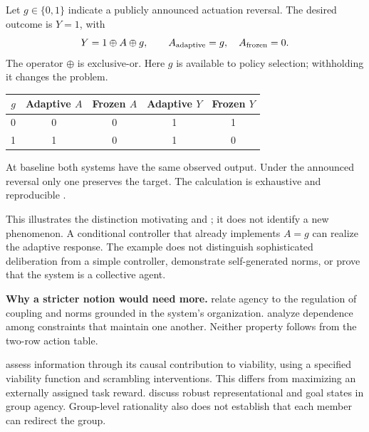 \documentclass[11pt,letterpaper]{article}
\begin{document}
 Let $g\in\{0,1\}$ indicate a publicly announced actuation reversal. The desired outcome is $Y=1$, with
\begin{equation}
 Y=1\oplus A\oplus g,
 \qquad A_{\rm adaptive}=g,\quad A_{\rm frozen}=0.
\end{equation}
The operator $\oplus$ is exclusive-or. Here $g$ is available to policy selection; withholding it changes the problem.
\begin{center}\begin{tabular}{ccccc}\toprule
$g$ & Adaptive $A$ & Frozen $A$ & Adaptive $Y$ & Frozen $Y$\\\midrule
0&0&0&1&1\\1&1&0&1&0\\\bottomrule\end{tabular}\end{center}
At baseline both systems have the same observed output. Under the announced reversal only one preserves the target. The calculation is exhaustive and reproducible \citep{tanwisuth2026strategic}.

This illustrates the distinction motivating \citet{kenton2022agents} and \citet{hammond2023games}; it does not identify a new phenomenon. A conditional controller that already implements $A=g$ can realize the adaptive response. The example does not distinguish sophisticated deliberation from a simple controller, demonstrate self-generated norms, or prove that the system is a collective agent.

\textbf{Why a stricter notion would need more.} \citet[PDF pp. 5--8]{barandiaran2009agency} relate agency to the regulation of coupling and norms grounded in the system's organization. \citet[author PDF pp. 10--13]{montevil2015constraints} analyze dependence among constraints that maintain one another. Neither property follows from the two-row action table.

\citet[PDF pp. 1--3]{kolchinsky2018semantic} assess information through its causal contribution to viability, using a specified viability function and scrambling interventions. This differs from maximizing an externally assigned task reward. \citet[author PDF pp. 1--4]{list2006group} discuss robust representational and goal states in group agency. Group-level rationality also does not establish that each member can redirect the group.
\end{document}
